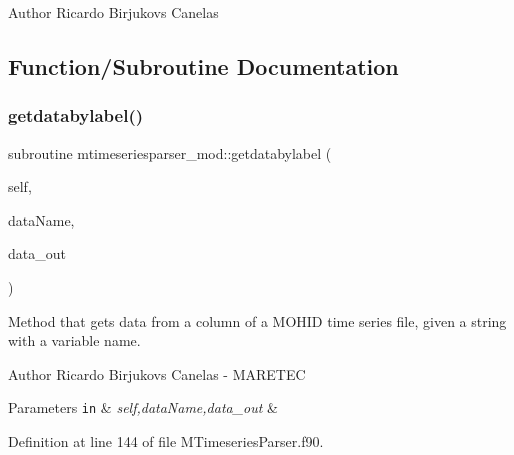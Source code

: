 \begin{DoxyAuthor}{Author}
Ricardo Birjukovs Canelas 
\end{DoxyAuthor}


\subsection{Function/\+Subroutine Documentation}
\mbox{\label{namespacemtimeseriesparser__mod_a99a6266d1929abd218dd968d5c27a30d}} 
\subsubsection{\texorpdfstring{getdatabylabel()}{getdatabylabel()}}
{\footnotesize\ttfamily subroutine mtimeseriesparser\+\_\+mod\+::getdatabylabel (\begin{DoxyParamCaption}\item[{class(\mbox{\hyperlink{structmtimeseriesparser__mod_1_1mtimeseriesparser__class}{mtimeseriesparser\+\_\+class}}), intent(in)}]{self,  }\item[{type(string), intent(in)}]{data\+Name,  }\item[{real(prec), dimension(\+:), intent(out), allocatable}]{data\+\_\+out }\end{DoxyParamCaption})\hspace{0.3cm}{\ttfamily [private]}}



Method that gets data from a column of a M\+O\+H\+ID time series file, given a string with a variable name. 

\begin{DoxyAuthor}{Author}
Ricardo Birjukovs Canelas -\/ M\+A\+R\+E\+T\+EC 
\end{DoxyAuthor}

\begin{DoxyParams}[1]{Parameters}
\mbox{\tt in}  & {\em self,data\+Name,data\+\_\+out} & \\
\hline
\end{DoxyParams}


Definition at line 144 of file M\+Timeseries\+Parser.\+f90.


